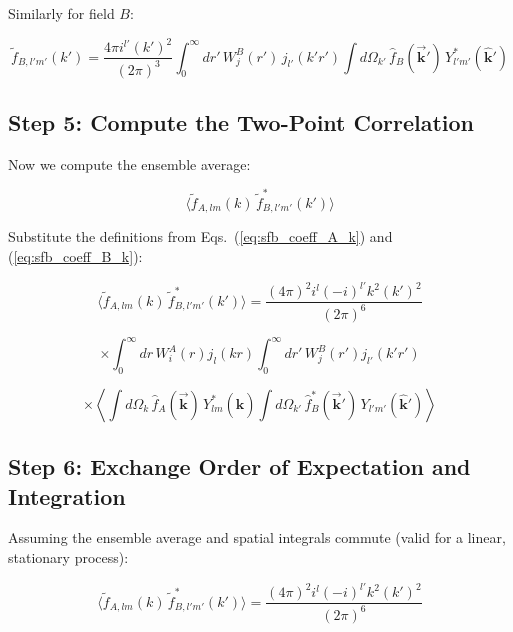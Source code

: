 Similarly for field $B$:

\begin{equation}
    \tilde{f}_{B,l'm'}(k') = \frac{4\pi i^{l'} (k')^2}{(2\pi)^3} \int_0^{\infty} dr' \, W_j^B(r') \, j_{l'}(k'r') \int d\Omega_{k'} \, \hat{f}_B(\vec{\mathbf{k}}') \, Y_{l'm'}^*(\hat{\mathbf{k}}')
\label{eq:sfb_coeff_B_k}
\end{equation}

\subsection{Step 5: Compute the Two-Point Correlation}

Now we compute the ensemble average:

\begin{equation}
    \langle \tilde{f}_{A,lm}(k) \, \tilde{f}_{B,l'm'}^*(k') \rangle
\label{eq:correlation_to_compute}
\end{equation}

Substitute the definitions from Eqs.~(\ref{eq:sfb_coeff_A_k}) and (\ref{eq:sfb_coeff_B_k}):

\begin{equation}
    \langle \tilde{f}_{A,lm}(k) \, \tilde{f}_{B,l'm'}^*(k') \rangle = \frac{(4\pi)^2 i^{l} (-i)^{l'} k^2 (k')^2}{(2\pi)^6}
\end{equation}

\begin{equation}
    \times \int_0^{\infty} dr \, W_i^A(r) j_{l}(kr) \int_0^{\infty} dr' \, W_j^B(r') j_{l'}(k'r')
\end{equation}

\begin{equation}
    \times \left\langle \int d\Omega_k \, \hat{f}_A(\vec{\mathbf{k}}) \, Y_{lm}^*(\hat{\mathbf{k}}) \int d\Omega_{k'} \, \hat{f}_B^*(\vec{\mathbf{k}}') \, Y_{l'm'}(\hat{\mathbf{k}}') \right\rangle
\label{eq:correlation_expanded}
\end{equation}

\subsection{Step 6: Exchange Order of Expectation and Integration}

Assuming the ensemble average and spatial integrals commute (valid for a linear, stationary process):

\begin{equation}
    \langle \tilde{f}_{A,lm}(k) \, \tilde{f}_{B,l'm'}^*(k') \rangle = \frac{(4\pi)^2 i^{l} (-i)^{l'} k^2 (k')^2}{(2\pi)^6}
\end{equation}

